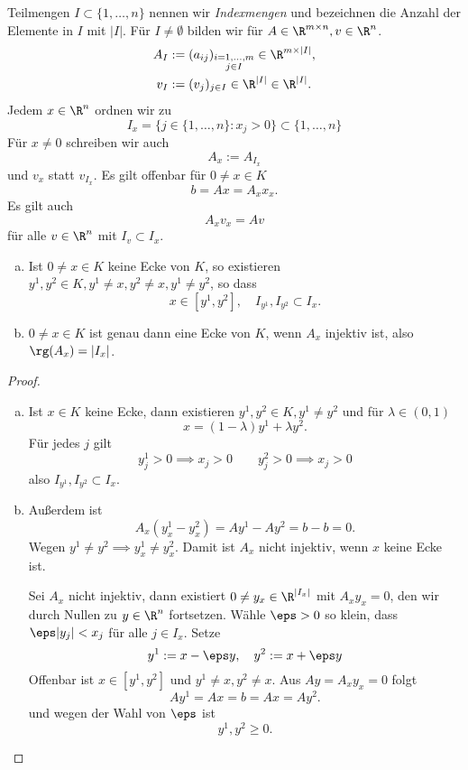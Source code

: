 \begin{df} \label{3.5}
	Teilmengen $I \subset \{1, \dotsc, n\}$ nennen wir \emph{Indexmengen} und bezeichnen die Anzahl der Elemente in $I$ mit $|I|$.
	Für $I \neq \emptyset$ bilden wir für $A \in \R^{m\times n}, v \in \R^n$.
	\begin{align*}
		A_I &:= (a_{ij})_{\substack{i=1,\dotsc,m \\ j \in I}}
			\in \R^{m\times |I|}, \\
		v_I &:= (v_j)_{j\in I} \in \R^{|I|}
			\in \R^{|I|}.
	\end{align*}
	Jedem $x \in \R^n$ ordnen wir zu
	\[
		I_x = \Big\{ j \in \{1, \dotsc, n\} : x_j > 0 \Big\}
		\subset \{1, \dotsc, n\}
	\]
	Für $x \neq 0$ schreiben wir auch
	\[
		A_x := A_{I_x}
	\]
	und $v_x$ statt $v_{I_x}$.
	Es gilt offenbar für $0 \neq x \in K$
	\[
		b = Ax = A_x x_x.
	\]
	Es gilt auch
	\[
		A_x v_x = A v
	\]
	für alle $v \in \R^n$ mit $I_v \subset I_x$.
\end{df}

\begin{lem} \label{3.6}
	\begin{enumerate}[(a)]
		\item
			Ist $0 \neq x \in K$ keine Ecke von $K$, so existieren $y^1, y^2 \in K, y^1 \neq x, y^2 \neq x, y^1 \neq y^2$, so dass
			\[
				x \in [y^1, y^2], \quad I_{y^1}, I_{y^2} \subset I_x.
			\]
		\item
			$0 \neq x \in K$ ist genau dann eine Ecke von $K$, wenn $A_x$ injektiv ist, also $\rg(A_x) = |I_x|$.
	\end{enumerate}
	\begin{proof}
		\begin{enumerate}[(a)]
			\item
				Ist $x \in K$ keine Ecke, dann existieren $y^1, y^2 \in K, y^1 \neq y^2$ und für $\lambda \in (0,1)$
				\[
					x = (1-\lambda) y^1 + \lambda y^2.
				\]
				Für jedes $j$ gilt
				\[
					y_j^1 > 0 \implies x_j > 0 \qquad
					y_j^2 > 0 \implies x_j > 0
				\]
				also $I_{y^1}, I_{y^2} \subset I_x$.
			\item
				Außerdem ist
				\[
					A_x (y_x^1 - y_x^2)
					= Ay^1 - Ay^2
					= b - b = 0.
				\]
				Wegen $y^1 \neq y^2 \implies y_x^1 \neq  y_x^2$.
				Damit ist $A_x$ nicht injektiv, wenn $x$ keine Ecke ist.

				Sei $A_x$ nicht injektiv, dann existiert $0 \neq y_x \in \R^{|I_x|}$ mit $A_x y_x = 0$, den wir durch Nullen zu $y \in \R^n$ fortsetzen.
				Wähle $\eps > 0$ so klein, dass $\eps |y_j| < x_j$ für alle $j \in I_x$.
				Setze
				\[
					y^1 := x - \eps y,
					\quad
					y^2 := x + \eps y
				\]
				Offenbar ist $x \in [y^1, y^2]$ und $y^1 \neq x, y^2 \neq x$.
				Aus $Ay = A_x y_x = 0$ folgt
				\[
					Ay^1 = Ax = b = Ax = Ay^2.
				\]
				und wegen der Wahl von $\eps$ ist
				\[
					y^1, y^2 \ge 0.
				\]
		\end{enumerate}
	\end{proof}
\end{lem}

